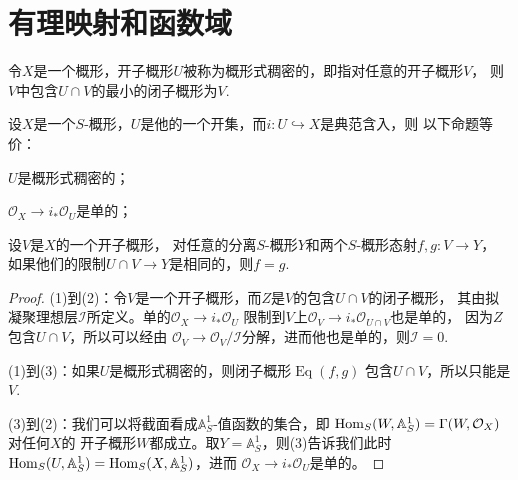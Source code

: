 


\section{有理映射和函数域}

\para[概形式稠密]
令$X$是一个概形，开子概形$U$被称为概形式稠密的，即指对任意的开子概形$V$，
则$V$中包含$U\cap V$的最小的闭子概形为$V$. 
\endpara

\begin{pro}
设$X$是一个$S$-概形，$U$是他的一个开集，而$i:U\hookrightarrow X$是典范含入，则
以下命题等价：
\begin{compactenum}[(1)]
	\item $U$是概形式稠密的；
	\item $\mathcal O_X\to i_*\mathcal O_U$是单的；
	\item 设$V$是$X$的一个开子概形，
	对任意的分离$S$-概形$Y$和两个$S$-概形态射$f,g:V\to Y$，
	如果他们的限制$U\cap V\to Y$是相同的，则$f=g$. 
\end{compactenum}
\end{pro}

\begin{proof}
(1)到(2)：令$V$是一个开子概形，而$Z$是$V$的包含$U\cap V$的闭子概形，
其由拟凝聚理想层$\mathcal I$所定义。单的$\mathcal O_X\to i_*\mathcal O_U$
限制到$V$上$\mathcal O_V\to i_*\mathcal O_{U\cap V}$也是单的，
因为$Z$包含$U\cap V$，所以可以经由
$\mathcal O_V\to \mathcal O_V/\mathcal I$分解，进而他也是单的，则$\mathcal I=0$. 


(1)到(3)：如果$U$是概形式稠密的，则闭子概形$\operatorname{Eq}(f,g)$
包含$U\cap V$，所以只能是$V$. 

(3)到(2)：我们可以将截面看成$\mathbb A_S^1$-值函数的集合，即
$\operatorname{Hom}_S(W,\mathbb A_S^1)=\Gamma(W,\mathcal O_X)$对任何$X$的
开子概形$W$都成立。取$Y=\mathbb A_S^1$，则(3)告诉我们此时
$\operatorname{Hom}_S(U,\mathbb A_S^1)=\operatorname{Hom}_S(X,\mathbb A_S^1)$，进而
$\mathcal O_X\to i_*\mathcal O_U$是单的。
\end{proof}

